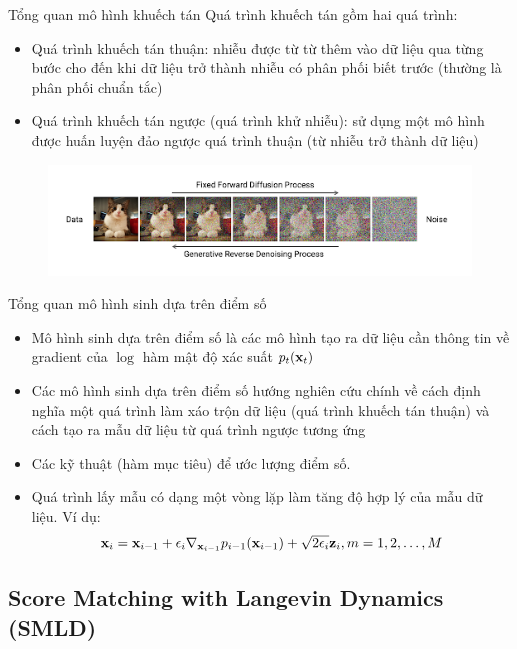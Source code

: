 \documentclass[10pt]{beamer}
\theoremstyle{remark}
\numberwithin{algocf}{section}
\numberwithin{equation}{section}
\numberwithin{dl}{section}
\numberwithin{figure}{section}
\begin{document}
\begin{frame}{Tổng quan mô hình khuếch tán}
	Quá trình khuếch tán gồm hai quá trình:
	\begin{itemize}
		\item Quá trình khuếch tán thuận: nhiễu được từ từ thêm vào dữ liệu qua từng bước cho đến khi dữ liệu trở thành nhiễu có phân phối biết trước (thường là phân phối chuẩn tắc)
		\item Quá trình khuếch tán ngược (quá trình khử nhiễu): sử dụng một mô hình được huấn luyện đảo ngược quá trình thuận (từ nhiễu trở thành dữ liệu)
	\end{itemize}
	\begin{figure}[H]
		\centering
		\includegraphics[width=0.9\linewidth]{figures/Fixed_Forward_Diffusion_Process.png}
	\end{figure}
\end{frame}

\begin{frame}{Tổng quan mô hình sinh dựa trên điểm số}
	\begin{itemize}
		\item Mô hình sinh dựa trên điểm số là các mô hình tạo ra dữ liệu cần thông tin về gradient của $\log$ hàm mật độ xác suất $p_t(\bold{x}_t)$
		\item Các mô hình sinh dựa trên điểm số hướng nghiên cứu chính về cách định nghĩa một quá trình làm xáo trộn dữ liệu (quá trình khuếch tán thuận) và cách tạo ra mẫu dữ liệu từ quá trình ngược tương ứng
		\item Các kỹ thuật (hàm mục tiêu) để ước lượng điểm số.
		\item Quá trình lấy mẫu có dạng một vòng lặp làm tăng độ hợp lý của mẫu dữ liệu. Ví dụ:
		\begin{equation*}
			\bold{x}_i = \bold{x}_{i-1} + \epsilon_i \nabla_{\bold{x}_{i-1}} p_{i-1}(\bold{x}_{i-1}) + \sqrt{2 \epsilon_i} \bold{z}_i, m = 1, 2, \dots, M
		\end{equation*}
	\end{itemize}
\end{frame}

\subsection{Score Matching with Langevin Dynamics (SMLD)}
\end{document}
